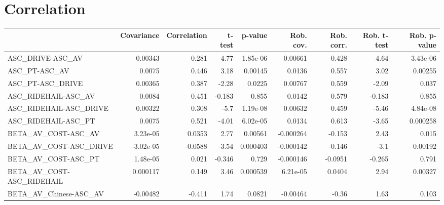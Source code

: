 \section{Correlation}
\begin{tabular}{lrrrrrrrr}
\toprule
{} &  Covariance &  Correlation &    t-test &  p-value &  Rob. cov. &  Rob. corr. &  Rob. t-test &  Rob. p-value \\
\midrule
ASC\_DRIVE-ASC\_AV                                   &     0.00343 &        0.281 &      4.77 & 1.85e-06 &    0.00661 &       0.428 &         4.64 &      3.43e-06 \\
ASC\_PT-ASC\_AV                                      &      0.0075 &        0.446 &      3.18 &  0.00145 &     0.0136 &       0.557 &         3.02 &       0.00255 \\
ASC\_PT-ASC\_DRIVE                                   &     0.00365 &        0.387 &     -2.28 &   0.0225 &    0.00767 &       0.559 &        -2.09 &         0.037 \\
ASC\_RIDEHAIL-ASC\_AV                                &      0.0084 &        0.451 &    -0.183 &    0.855 &     0.0142 &       0.579 &       -0.183 &         0.855 \\
ASC\_RIDEHAIL-ASC\_DRIVE                             &     0.00322 &        0.308 &      -5.7 & 1.19e-08 &    0.00632 &       0.459 &        -5.46 &      4.84e-08 \\
ASC\_RIDEHAIL-ASC\_PT                                &      0.0075 &        0.521 &     -4.01 & 6.02e-05 &     0.0134 &       0.613 &        -3.65 &      0.000258 \\
BETA\_AV\_COST-ASC\_AV                                &    3.23e-05 &       0.0353 &      2.77 &  0.00561 &  -0.000264 &      -0.153 &         2.43 &         0.015 \\
BETA\_AV\_COST-ASC\_DRIVE                             &   -3.02e-05 &      -0.0588 &     -3.54 & 0.000403 &  -0.000142 &      -0.146 &         -3.1 &       0.00192 \\
BETA\_AV\_COST-ASC\_PT                                &    1.48e-05 &        0.021 &    -0.346 &    0.729 &  -0.000146 &     -0.0951 &       -0.265 &         0.791 \\
BETA\_AV\_COST-ASC\_RIDEHAIL                          &    0.000117 &        0.149 &      3.46 & 0.000539 &   6.21e-05 &      0.0404 &         2.94 &       0.00327 \\
BETA\_AV\_Chinese-ASC\_AV                             &    -0.00482 &       -0.411 &      1.74 &   0.0821 &   -0.00464 &       -0.36 &         1.63 &         0.103 \\

\end{tabular}
